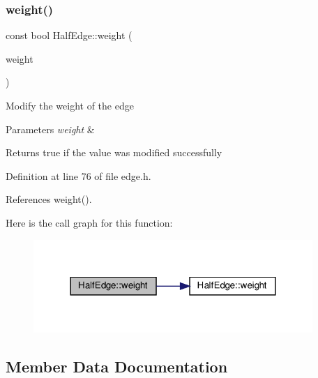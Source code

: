 \mbox{\label{classHalfEdge_ac1a67d4cdc5cd8ff286f7f27d691323d}} 
\subsubsection{\texorpdfstring{weight()}{weight()}\hspace{0.1cm}{\footnotesize\ttfamily [2/2]}}
{\footnotesize\ttfamily const bool Half\+Edge\+::weight (\begin{DoxyParamCaption}\item[{const \hyperlink{edge_8h_a2e7ea3be891ac8b52f749ec73fee6dd2}{type\+Weight} \&}]{weight }\end{DoxyParamCaption})\hspace{0.3cm}{\ttfamily [inline]}}

Modify the weight of the edge 
\begin{DoxyParams}{Parameters}
{\em weight} & \\
\hline
\end{DoxyParams}
\begin{DoxyReturn}{Returns}
true if the value was modified successfully 
\end{DoxyReturn}


Definition at line 76 of file edge.\+h.



References weight().

Here is the call graph for this function\+:
\nopagebreak
\begin{figure}[H]
\begin{center}
\leavevmode
\includegraphics[width=300pt]{classHalfEdge_ac1a67d4cdc5cd8ff286f7f27d691323d_cgraph}
\end{center}
\end{figure}


\subsection{Member Data Documentation}
\mbox{\label{classHalfEdge_adcf841beaad30d58d0e9883c2fbc196e}} 
